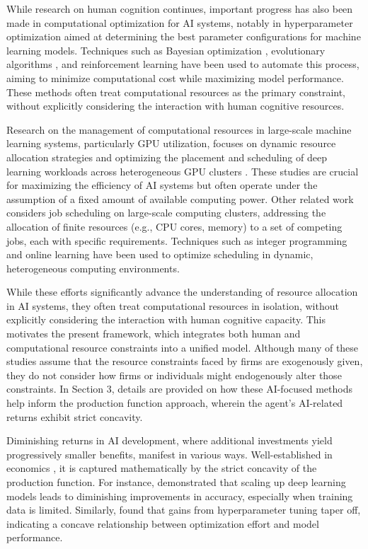 While research on human cognition continues, important progress has also been made in computational optimization for AI systems, notably in hyperparameter optimization aimed at determining the best parameter configurations for machine learning models. Techniques such as Bayesian optimization \citep{snoek2012practical}, evolutionary algorithms \citep{real2019regularized}, and reinforcement learning \citep{elsken2019neural} have been used to automate this process, aiming to minimize computational cost while maximizing model performance. These methods often treat computational resources as the primary constraint, without explicitly considering the interaction with human cognitive resources.

Research on the management of computational resources in large-scale machine learning systems, particularly GPU utilization, focuses on dynamic resource allocation strategies \citep{grandl2014multi} and optimizing the placement and scheduling of deep learning workloads across heterogeneous GPU clusters \citep{mirhosseini2017binochs}. These studies are crucial for maximizing the efficiency of AI systems but often operate under the assumption of a fixed amount of available computing power. Other related work considers job scheduling on large-scale computing clusters, addressing the allocation of finite resources (e.g., CPU cores, memory) to a set of competing jobs, each with specific requirements. Techniques such as integer programming \citep{mittal2013general} and online learning \citep{li2022optimizing} have been used to optimize scheduling in dynamic, heterogeneous computing environments.

While these efforts significantly advance the understanding of resource allocation in AI systems, they often treat computational resources in isolation, without explicitly considering the interaction with human cognitive capacity. This motivates the present framework, which integrates both human and computational resource constraints into a unified model. Although many of these studies assume that the resource constraints faced by firms are exogenously given, they do not consider how firms or individuals might endogenously alter those constraints. In Section 3, details are provided on how these AI-focused methods help inform the production function approach, wherein the agent’s AI-related returns exhibit strict concavity.

Diminishing returns in AI development, where additional investments yield progressively smaller benefits, manifest in various ways. Well-established in economics \citep{dixit1990optimization}, it is captured mathematically by the strict concavity of the production function. For instance, \cite{kaplan2020scaling} demonstrated that scaling up deep learning models leads to diminishing improvements in accuracy, especially when training data is limited. Similarly, \cite{snoek2012practical} found that gains from hyperparameter tuning taper off, indicating a concave relationship between optimization effort and model performance.

